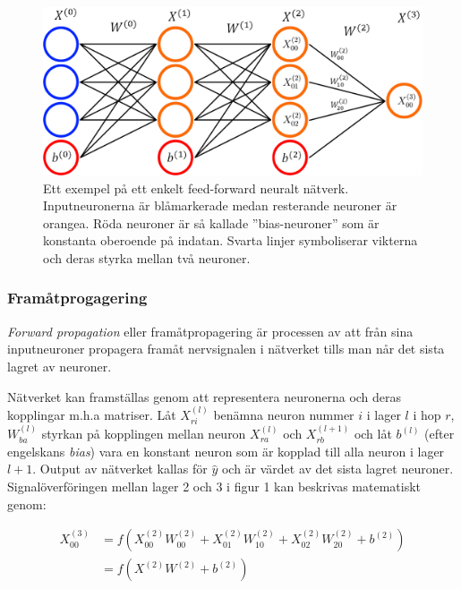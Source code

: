 \documentclass[a4paper,11pt,twoside]{article}
\begin{document}
\begin{figure}[h]\label{figFCC}
	\centering
  		\includegraphics[scale=0.4]{FCC.png}
  	\caption{Ett exempel på ett enkelt feed-forward neuralt nätverk. Inputneuronerna är blåmarkerade medan resterande neuroner är orangea. Röda neuroner är så kallade ”bias-neuroner” som är konstanta oberoende på indatan. Svarta linjer symboliserar vikterna och deras styrka mellan två neuroner.}
\end{figure}



\subsubsection{Framåtprogagering}
\textit{Forward propagation} eller framåtpropagering är processen av att från sina inputneuroner propagera framåt nervsignalen i nätverket tills man når det sista lagret av neuroner. \cite{cs231n}

Nätverket kan framställas genom att representera neuronerna och deras kopplingar m.h.a matriser. Låt $X_{ri}^{(l)}$ benämna neuron nummer $i$ i lager $l$ i hop $r$, $W_{ba}^{(l)}$ styrkan på kopplingen mellan neuron $X_{ra}^{(l)}$ och $X_{rb}^{(l+1)}$ och låt $b^{(l)}$ (efter engelskans \textit{bias}) vara en konstant neuron som är kopplad till alla neuron i lager $l+1$. Output av nätverket kallas för $\hat{y}$ och är värdet av det sista lagret neuroner. Signalöverföringen mellan lager 2 och 3 i figur 1 kan beskrivas matematiskt genom: \cite{cs231n} \cite{wikiStanford}

\begin{equation}
\begin{split}
X_{00}^{(3)} & = f(X_{00}^{(2)}W_{00}^{(2)} + X_{01}^{(2)}W_{10}^{(2)} + X_{02}^{(2)}W_{20}^{(2)} + b^{(2)}) \\
			 & = f(X^{(2)}W^{(2)} +b^{(2)})
\end{split}
\end{equation}
\end{document}
